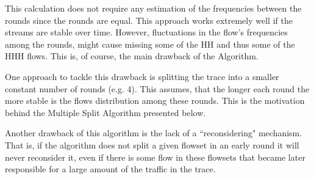 This calculation does not require any estimation of the frequencies between the rounds since the rounds are equal. This approach works extremely well if the streams are stable over time. However, fluctuations in the flow's frequencies among the rounds, might cause missing some of the HH and thus some of the HHH flows. This is, of course, the main drawback of the \simpleAlgo Algorithm.

One approach to tackle this drawback is splitting the trace into a smaller constant number of rounds (e.g. 4). This assumes, that the longer each round the more stable is the flows distribution among these rounds. This is the motivation behind the Multiple Split Algorithm presented below.

Another drawback of this algorithm is the lack of a ``reconsidering" mechanism. That is, if the algorithm does not split a given flowset in an early round it will never reconsider it, even if there is some flow in these flowsets that became later responsible for a large amount of the traffic in the trace.


